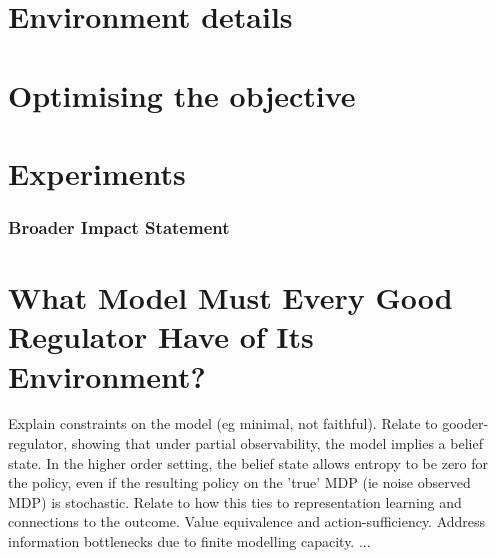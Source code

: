 \section{Environment details}
\label{app:envs}

\section{Optimising the objective}
\label{sec:algorithm}


\section{Experiments}
\label{app:experiments}



\subsubsection*{Broader Impact Statement}
\label{sec:broaderImpact}

\section{What Model Must Every Good Regulator Have of Its Environment?}
\label{sec:model}

 Explain constraints on the model (eg minimal, not faithful). Relate to gooder-regulator, showing that under partial observability, the model implies a belief state. In the higher order setting, the belief state allows entropy to be zero for the policy, even if the resulting policy on the 'true' MDP (ie noise observed MDP) is stochastic.
Relate to how this ties to representation learning and connections to the outcome.
Value equivalence and action-sufficiency.
Address information bottlenecks due to finite modelling capacity.
...

